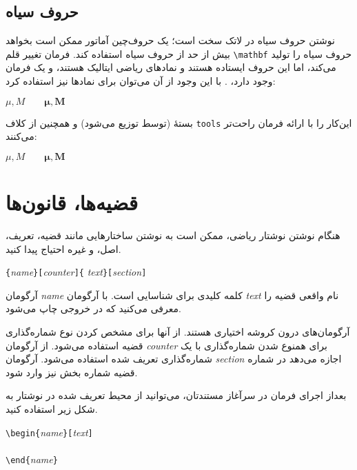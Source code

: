 
\subsection{حروف سیاه}

نوشتن حروف سیاه در لاتک سخت است؛ یک حروف‌چین‌ آماتور ممکن است بخواهد بیش‌ از ‌حد از حروف سیاه استفاده کند. فرمان تغییر قلم \verb|\mathbf| حروف سیاه را تولید می‌کند، اما این حروف ایستاده هستند و نمادهای ریاضی ایتالیک هستند، و یک فرمان   وجود دارد، . 
با این وجود از آن می‌توان برای نماد‌ها نیز استفاده کرد:
\begin{example}
$\mu, M \qquad 
\mathbf{\mu}, \mathbf{M}$
\qquad {}
\end{example}

بستۀ   (توسط  توزیع می‌شود) 
و همچنین 
 از کلاف \texttt{tools} این‌کار را با ارائه فرمان   راحت‌تر می‌کنند:

\begin{example}
$\mu, M \qquad
\boldsymbol{\mu}, \boldsymbol{M}$
\end{example}
\section{قضیه‌ها، قانون‌ها}

هنگام نوشتن نوشتار‌‌ ریاضی، ممکن است به نوشتن ساختار‌هایی مانند قضیه، تعریف، اصل، و غیره احتیاج پیدا کنید.
\begin{lscommand}
\verb|{|\emph{name}\verb|}[|\emph{counter}\verb|]{|%
         \emph{text}\verb|}[|\emph{section}\verb|]|
\end{lscommand}
آرگومان \emph{name} کلمه کلیدی برای شناسایی  است. با آرگومان \emph{text} نام واقعی قضیه را معرفی می‌کنید که در خروجی چاپ می‌شود.

آرگومان‌های درون کروشه اختیاری هستند. از آنها برای مشخص کردن نوع شماره‌گذاری قضیه استفاده می‌شود. از آرگومان \emph{counter} 
برای همنوع شدن شماره‌گذاری با یک شماره‌گذاری تعریف شده استفاده می‌شود. آرگومان \emph{section} اجازه می‌دهد در شماره قضیه شماره بخش نیز وارد شود.

بعداز اجرای فرمان  در سرآغاز مستندتان، می‌توانید از محیط تعریف شده در نوشتار‌ به شکل زیر استفاده کنید.
\begin{code}
\verb|\begin{|\emph{name}\verb|}[|\emph{text}\verb|]|\\
\\
\verb|\end{|\emph{name}\verb|}|     
\end{code}

